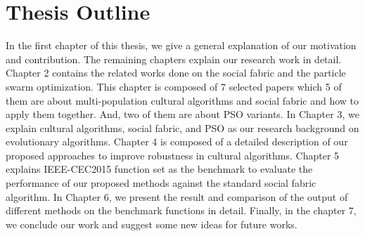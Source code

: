 \section{Thesis Outline}
In the first chapter of this thesis, we give a general explanation of our motivation and contribution. The remaining chapters explain our research work in detail. Chapter 2 contains the related works done on the social fabric and the particle swarm optimization. This chapter is composed of 7 selected papers which 5 of them are about multi-population cultural algorithms and social fabric and how to apply them together. And, two of them are about PSO variants. In Chapter 3, we explain cultural algorithms, social fabric, and PSO as our research background on evolutionary algorithms. Chapter 4 is composed of a detailed description of our proposed approaches to improve robustness in cultural algorithms. Chapter 5 explains IEEE-CEC2015 function set as the benchmark to evaluate the performance of our proposed methods against the standard social fabric algorithm. In Chapter 6, we present the result and comparison of the output of different methods on the benchmark functions in detail. Finally, in the chapter 7, we conclude our work and suggest some new ideas for future works.